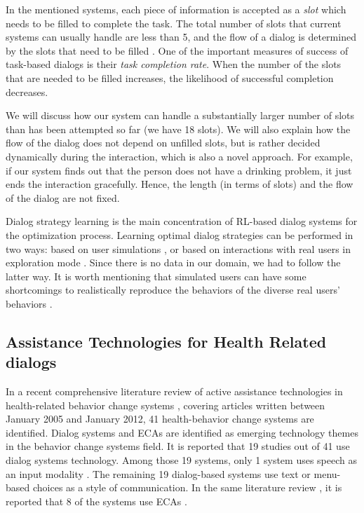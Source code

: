 \begin{sloppy}
In the mentioned systems, each piece of information is accepted as a {\em slot} which needs to be filled to complete the task. The total number of slots that current systems can usually handle are less than 5, and the flow of a dialog is determined by the slots that  need to be filled \cite{NjFunSingh02}.  One of the important measures of success of task-based dialogs is their {\em task completion rate}. When the number of the slots that are needed to be filled increases, the likelihood of successful completion decreases.

We will discuss how our system can handle a substantially larger number of slots than has been attempted so far (we have 18 slots).  We will also explain how the flow  of the dialog does not depend on unfilled slots, but is rather decided dynamically during the interaction, which is also a novel approach.
For example, if our system finds out that the person does not have a drinking problem, it just ends the interaction gracefully. Hence, the  length (in terms of slots) and the flow of the dialog are not fixed.

Dialog strategy learning is the main concentration of RL-based dialog systems for the optimization process. Learning optimal dialog strategies can be performed in two ways: based on user simulations \cite{georgila2006user}, or based on interactions with real users in exploration mode \cite{NjFunSingh02,misu2012reinforcement}. Since there is no data in our domain, we had to follow the latter way. It is worth mentioning that simulated users can have some shortcomings to realistically reproduce the behaviors of the diverse  real users' behaviors \cite{schatzmann2005quantitative}. 

\subsection{Assistance Technologies for Health Related dialogs}

In a recent comprehensive literature review of active assistance technologies in health-related behavior change systems \cite{kennedy2012active}, covering articles written between January 2005 and January 2012, 41 health-behavior change systems are identified. Dialog systems and ECAs are identified as emerging technology themes in the behavior change systems field. It is reported that 19 studies out of 41 use dialog systems technology. Among those 19 systems, only 1 system uses speech as an input modality \cite{Levin2006Spoken}. The remaining 19 dialog-based systems use text or menu-based choices as a style of communication. In the same literature review \cite{kennedy2012active}, it is reported that 8 of the systems use ECAs \cite{Bickmore2005,Bickmore2011,Turunen2011,DeRosis2006}.


\end{sloppy}
